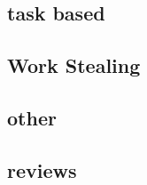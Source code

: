 \documentclass{article}
\begin{document}
\subsection{task based}

\cite{CPE:CPE1631}
\cite{Bhatti2017}
\cite{5599103}
\cite{Posner2018}
\cite{CCGrid2018}
\cite{8025281}
\cite{7307597}
\cite{Galvez:2017:ATM:3079079.3079104} %


\subsection{Work Stealing}
\cite{Yang2017}
\cite{Chen:2015:LWS:2775085.2766450}
\cite{Blumofe:1999:SMC:324133.324234}
\cite{Cilk}
\cite{Saraswat:2011:LGL:1941553.1941582}

\subsection{other}

\cite{Gao:2017:MPL:3110224.3110240}
\cite{CAMPOS20001213}
\cite{PINAR2004974}
\cite{7551381}
\cite{Menon:2013:DDL:2503210.2503284}
\cite{Liu:2017}
\cite{SEVERIUKHINA2017139}
\cite{7965131}


\subsection{reviews}

\cite{Teresco_2partitioning}

\printbibliography
\end{document}
